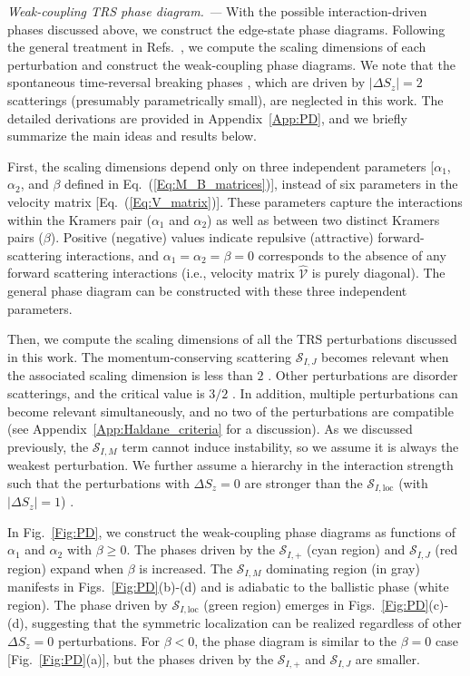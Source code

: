 \documentclass[aps,prx,amsmath,superscriptaddress,twocolumn,bibnotes,longbibliography,floatfix]{revtex4-2}
\begin{document}
	\textit{Weak-coupling TRS phase diagram. ---} With the possible interaction-driven phases discussed above, we construct the edge-state phase diagrams. Following the general treatment in Refs.~\cite{MooreJE1998,XuC2006}, we compute the scaling dimensions of each perturbation and construct the weak-coupling phase diagrams. We note that the spontaneous time-reversal breaking phases \cite{XuC2006,WuC2006,ChouYZ2024,ChouYZ2018,ChouYZ2019,KainarisN2014}, which are driven by $|\Delta S_z|=2$ scatterings (presumably parametrically small), are neglected in this work. The detailed derivations are provided in Appendix~\ref{App:PD}, and we briefly summarize the main ideas and results below.

	First, the scaling dimensions depend only on three independent parameters \cite{XuC2006} [$\alpha_1$, $\alpha_2$, and $\beta$ defined in Eq.~(\ref{Eq:M_B_matrices})], instead of six parameters in the velocity matrix [Eq.~(\ref{Eq:V_matrix})]. These parameters capture the interactions within the Kramers pair ($\alpha_1$ and $\alpha_2$) as well as between two distinct Kramers pairs ($\beta$). Positive (negative) values indicate repulsive (attractive) forward-scattering interactions, and $\alpha_1=\alpha_2=\beta=0$ corresponds to the absence of any forward scattering interactions (i.e., velocity matrix $\hat{\mathcal{V}}$ is purely diagonal). The general phase diagram can be constructed with these three independent parameters.

	Then, we compute the scaling dimensions of all the TRS perturbations discussed in this work. The momentum-conserving scattering $\mathcal{S}_{I,J}$ becomes relevant when the associated scaling dimension is less than $2$ \cite{GiamarchiT2003,GogolinAO2004}. Other perturbations are disorder scatterings, and the critical value is $3/2$ \cite{GiamarchiT1988,GiamarchiT2003}. In addition, multiple perturbations can become relevant simultaneously, and no two of the perturbations are compatible (see Appendix~\ref{App:Haldane_criteria} for a discussion). As we discussed previously, the $\mathcal{S}_{I,M}$ term cannot induce instability, so we assume it is always the weakest perturbation. We further assume a hierarchy in the interaction strength such that the perturbations with $\Delta S_z=0$ are stronger than the $\mathcal{S}_{I,\text{loc}}$ (with $|\Delta S_z|=1$) \cite{ChouYZ2024}.


	In Fig.~\ref{Fig:PD}, we construct the weak-coupling phase diagrams as functions of $\alpha_1$ and $\alpha_2$ with $\beta\ge 0$. The phases driven by the $\mathcal{S}_{I,+}$ (cyan region) and $\mathcal{S}_{I,J}$ (red region) expand when $\beta$ is increased. The $\mathcal{S}_{I,M}$ dominating region (in gray) manifests in Figs.~\ref{Fig:PD}(b)-(d) and is adiabatic to the ballistic phase (white region). The phase driven by $\mathcal{S}_{I,\text{loc}}$ (green region) emerges in Figs.~\ref{Fig:PD}(c)-(d), suggesting that the symmetric localization can be realized regardless of other $\Delta S_z=0$ perturbations. For $\beta<0$, the phase diagram is similar to the $\beta=0$ case [Fig.~\ref{Fig:PD}(a)], but the phases driven by the $\mathcal{S}_{I,+}$ and $\mathcal{S}_{I,J}$ are smaller.
\end{document}
